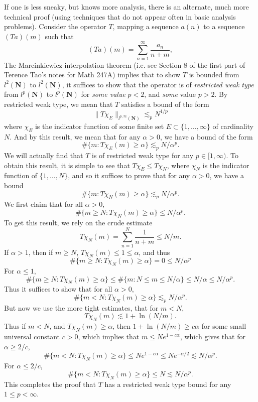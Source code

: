 \documentclass{exam}
\theoremstyle{problemstyle}
\newcommand{\1}[1]{\textbf{1}_{\left[#1\right]}} %
\begin{document}
\begin{questions}
\begin{solution}
	If one is less sneaky, but knows more analysis, there is an alternate, much more technical proof (using techniques that do not appear often in basic analysis problems). Consider the operator $T$, mapping a sequence $a(n)$ to a sequence $(Ta)(m)$ such that
	\[ (Ta)(m) = \sum_{n = 1}^\infty \frac{a_n}{n+m}, \]
	The Marcinkiewicz interpolation theorem (i.e. see Section 8 of the first part of Terence Tao's notes for Math 247A) implies that to show $T$ is bounded from $l^2(\mathbf{N})$ to $l^2(\mathbf{N})$, it suffices to show that the operator is of \emph{restricted weak type} from $l^p(\mathbf{N})$ to $l^p(\mathbf{N})$ for \emph{some value} $p < 2$, and \emph{some} value $p > 2$. By restricted weak type, we mean that $T$ satisfies a bound of the form
	\[ \| T \chi_E \|_{l^{p,\infty}(\mathbf{N})} \lesssim_p N^{1/p} \]
	where $\chi_E$ is the indicator function of some finite set $E \subset \{ 1,\dots, \infty \}$ of cardinality $N$. And by this result, we mean that for any $\alpha > 0$, we have a bound of the form
	\[ \# \{ m : T \chi_E (m) \geq \alpha \} \lesssim_p N / \alpha^p. \]
	We will actually find that $T$ is of restricted weak type for any $p \in [1,\infty)$. To obtain this result, it is simple to see that $T\chi_E \leq T\chi_N$, where $\chi_N$ is the indicator function of $\{ 1, \dots, N \}$, and so it suffices to prove that for any $\alpha > 0$, we have a bound
	\[ \# \{ m : T \chi_N(m) \geq \alpha \} \lesssim_p N / \alpha^p. \]
	We first claim that for all $\alpha > 0$,
	\[ \# \{ m \geq N : T \chi_N(m) \geq \alpha \} \leq N / \alpha^p. \]
	To get this result, we rely on the crude estimate
	\[ T \chi_N(m) = \sum_{n = 1}^N \frac{1}{n + m} \leq N/m. \]
	If $\alpha > 1$, then if $m \geq N$, $T \chi_N(m) \leq 1 \leq \alpha$, and thus
	\[ \# \{ m \geq N : T \chi_N(m) \geq \alpha \} = 0 \leq N / \alpha^p \]
	For $\alpha \leq 1$,
	\[ \# \{ m \geq N: T \chi_N(m) \geq \alpha \} \leq \# \{ m : N \leq m \leq N/\alpha \} \leq N / \alpha \leq N / \alpha^p. \]
	Thus it suffices to show that for all $\alpha > 0$,
	\[ \# \{ m < N : T \chi_N(m) \geq \alpha \} \lesssim_p N / \alpha^p. \]
	But now we use the more tight estimates, that for $m < N$,
	\[ T \chi_N(m) \lesssim 1 + \ln(N/m). \]
	Thus if $m < N$, and $T \chi_N(m) \geq \alpha$, then $1 + \ln(N/m) \geq c \alpha$ for some small universal constant $c > 0$, which implies that $m \leq N e^{1 - c \alpha}$, which gives that for $\alpha \geq 2/c$,
	\[ \# \{ m < N : T\chi_N(m) \geq \alpha \} \leq N e^{1 - c \alpha} \leq N e^{- \alpha / 2} \lesssim N / \alpha^p. \]
	For $\alpha \leq 2/c$,
	\[ \# \{ m < N : T\chi_N(m) \geq \alpha \} \leq N \lesssim N / \alpha^p. \]
	This completes the proof that $T$ has a restricted weak type bound for any $1 \leq p < \infty$.
\end{solution}

\end{questions}
\end{document}
